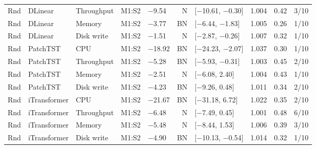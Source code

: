 \documentclass[a4paper,11pt]{article}
\begin{document}
\begin{longtable}{@{}lllllrlrrr@{}}
Rnd & DLinear & Throughput & M1:S2 & $-$9.54 & N & [$-$10.61, $-$0.30] & 1.004 & 0.42 & 3/10 \\
Rnd & DLinear & Memory & M1:S2 & $-$3.77 & BN & [$-$6.44, $-$1.83] & 1.005 & 0.26 & 1/10 \\
Rnd & DLinear & Disk write & M1:S2 & $-$1.51 & N & [$-$2.87, $-$0.26] & 1.007 & 0.32 & 1/10 \\
Rnd & PatchTST & CPU & M1:S2 & $-$18.92 & BN & [$-$24.23, $-$2.07] & 1.037 & 0.30 & 1/10 \\
Rnd & PatchTST & Throughput & M1:S2 & $-$5.28 & BN & [$-$5.93, $-$0.31] & 1.003 & 0.45 & 2/10 \\
Rnd & PatchTST & Memory & M1:S2 & $-$2.51 & N & [$-$6.08, 2.40] & 1.004 & 0.43 & 1/10 \\
Rnd & PatchTST & Disk write & M1:S2 & $-$4.23 & BN & [$-$9.26, 0.48] & 1.011 & 0.34 & 2/10 \\
Rnd & iTransformer & CPU & M1:S2 & $-$21.67 & BN & [$-$31.18, 6.72] & 1.022 & 0.35 & 2/10 \\
Rnd & iTransformer & Throughput & M1:S2 & $-$6.48 & N & [$-$7.49, 0.45] & 1.001 & 0.48 & 6/10 \\
Rnd & iTransformer & Memory & M1:S2 & $-$5.48 & N & [$-$8.44, 1.53] & 1.006 & 0.39 & 3/10 \\
Rnd & iTransformer & Disk write & M1:S2 & $-$4.90 & BN & [$-$10.13, $-$0.54] & 1.014 & 0.32 & 1/10 \\
\end{longtable}
\normalsize\setlength{\tabcolsep}{4pt}
\end{document}
